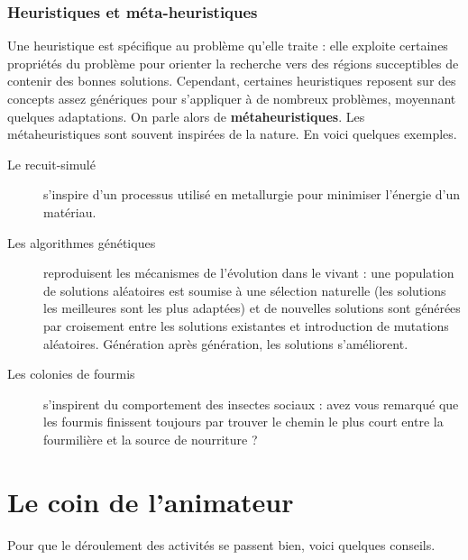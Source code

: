 \documentclass[a5paper,pagesize,DIV=14]{scrbook}
\begin{document}
\subsection*{Heuristiques et méta-heuristiques}

Une heuristique est spécifique au problème qu'elle traite : elle exploite certaines propriétés du problème pour orienter la recherche vers des \og régions \fg succeptibles de contenir des bonnes solutions. Cependant, certaines heuristiques reposent sur des concepts assez génériques pour s'appliquer à de nombreux problèmes, moyennant quelques adaptations. On parle alors de \textbf{métaheuristiques}. Les métaheuristiques sont souvent inspirées de la nature. En voici quelques exemples.

\begin{description}
  \item[Le recuit-simulé] s'inspire d'un processus utilisé en metallurgie pour minimiser l'énergie d'un matériau.
  \item[Les algorithmes génétiques] reproduisent les mécanismes de l'évolution dans le vivant : une population de solutions aléatoires est soumise à une sélection naturelle (les solutions les meilleures sont les plus adaptées) et de nouvelles solutions sont générées par croisement entre les solutions existantes et introduction de mutations aléatoires. Génération après génération, les solutions s'améliorent.
  \item[Les colonies de fourmis] s'inspirent du comportement des insectes sociaux : avez vous remarqué que les fourmis finissent toujours par trouver le chemin le plus court entre la fourmilière et la source de nourriture ?
\end{description}

\chapter*{Le coin de l'animateur}
\label{chap:coin-animateur}

Pour que le déroulement des activités se passent bien, voici quelques conseils.

\end{document}

